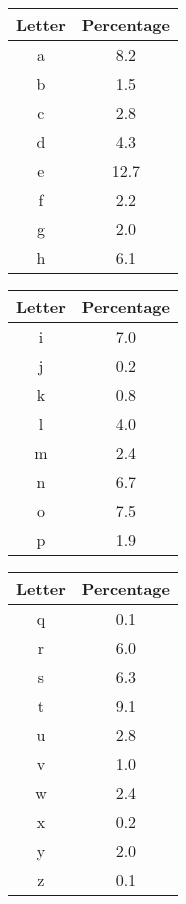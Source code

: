 \documentclass[12pt]{article}
\begin{document}
\begin{center}
	\begin{multicols}{3}
		\begin{tabular}{||c | c||}
			\hline
			Letter & Percentage \\
			\hline\hline
			a & 8.2 \\ 
			\hline
			b & 1.5 \\
			\hline
			c & 2.8 \\
			\hline
			d & 4.3 \\
			\hline
			e & 12.7 \\
			\hline
			f & 2.2 \\
			\hline
			g & 2.0 \\
			\hline
			h & 6.1 \\
			\hline
		\end{tabular}
		\begin{tabular}{||c | c||}
			\hline
			Letter & Percentage \\
			\hline\hline
			i & 7.0 \\
			\hline
			j & 0.2 \\
			\hline
			k & 0.8 \\
			\hline
			l & 4.0 \\
			\hline
			m & 2.4 \\
			\hline
			n & 6.7 \\
			\hline
			o & 7.5 \\
			\hline
			p & 1.9 \\
			\hline
		\end{tabular}
		\begin{tabular}{||c | c||}
			\hline
			Letter & Percentage \\
			\hline\hline
			q & 0.1 \\
			\hline
			r & 6.0 \\
			\hline 
			s & 6.3 \\ 
			\hline 
			t & 9.1 \\
			\hline 
			u & 2.8 \\
			\hline 
			v & 1.0 \\
			\hline 
			w & 2.4 \\
			\hline
			x & 0.2 \\
			\hline
			y & 2.0 \\
			\hline 
			z & 0.1 \\
			\hline 
		\end{tabular}
	\end{multicols}
\end{center}
\cite[pg. 19]{codebook}


\end{document}
